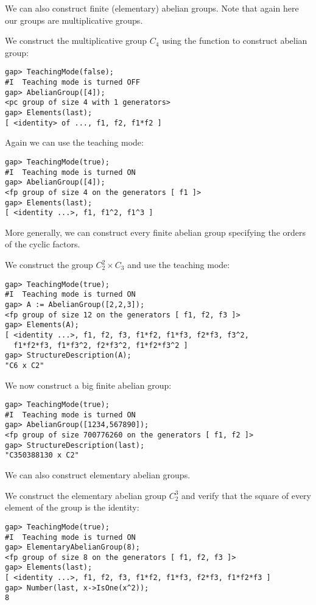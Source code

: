 We can also construct finite (elementary) abelian groups. Note that
again here our groups are multiplicative groups. 

\begin{example}
We construct the multiplicative group $C_4$ using
the function to construct abelian group:
\begin{lstlisting}
gap> TeachingMode(false);
#I  Teaching mode is turned OFF
gap> AbelianGroup([4]);
<pc group of size 4 with 1 generators>
gap> Elements(last);
[ <identity> of ..., f1, f2, f1*f2 ]
\end{lstlisting}
Again we can use the teaching mode:
\begin{lstlisting}
gap> TeachingMode(true);
#I  Teaching mode is turned ON
gap> AbelianGroup([4]);
<fp group of size 4 on the generators [ f1 ]>
gap> Elements(last);
[ <identity ...>, f1, f1^2, f1^3 ]
\end{lstlisting}
\end{example}

More generally, we can construct 
every finite abelian group
specifying the orders of the cyclic factors.

\begin{example}
We construct the group $C_2^2\times C_3$ and use
the teaching mode:
\begin{lstlisting}
gap> TeachingMode(true);
#I  Teaching mode is turned ON
gap> A := AbelianGroup([2,2,3]);
<fp group of size 12 on the generators [ f1, f2, f3 ]>
gap> Elements(A);
[ <identity ...>, f1, f2, f3, f1*f2, f1*f3, f2*f3, f3^2,
  f1*f2*f3, f1*f3^2, f2*f3^2, f1*f2*f3^2 ]
gap> StructureDescription(A);
"C6 x C2"
\end{lstlisting}
\end{example}

\begin{example}
We now construct a big finite abelian group:
\begin{lstlisting}
gap> TeachingMode(true);
#I  Teaching mode is turned ON
gap> AbelianGroup([1234,567890]);
<fp group of size 700776260 on the generators [ f1, f2 ]>
gap> StructureDescription(last);
"C350388130 x C2"
\end{lstlisting}
\end{example}

We can also construct elementary abelian groups.

\begin{example}
We construct the elementary abelian group $C_2^3$ and
verify that the square of 
every element of the group is the identity:
\begin{lstlisting}
gap> TeachingMode(true);
#I  Teaching mode is turned ON
gap> ElementaryAbelianGroup(8);
<fp group of size 8 on the generators [ f1, f2, f3 ]>
gap> Elements(last);
[ <identity ...>, f1, f2, f3, f1*f2, f1*f3, f2*f3, f1*f2*f3 ]
gap> Number(last, x->IsOne(x^2));
8
\end{lstlisting}
\end{example}

